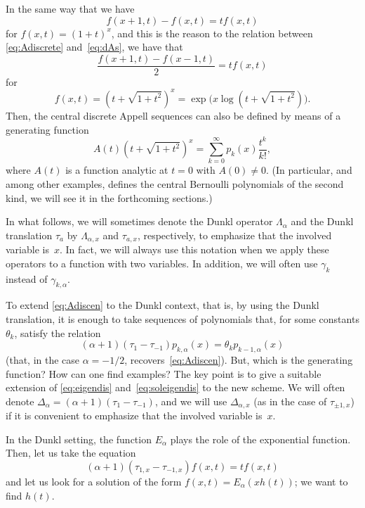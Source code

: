\documentclass[11pt]{article}
\theoremstyle{plain}
\theoremstyle{remark}
\numberwithin{equation}{section} %
\newcommand{\Ea}{E_{\alpha}}
\newcommand{\La}{\Lambda_{\alpha}}
\newcommand{\Lax}{\Lambda_{\alpha,x}}
\newcommand{\cc}{\gamma}
\begin{document}
In the same way that we have
\[
  f(x+1,t) - f(x,t) = t f(x,t)
\]
for $f(x,t) = (1+t)^x$, and this is the reason to the relation between \eqref{eq:Adiscrete} and~\eqref{eq:dAs}, we have that
\begin{equation}
\label{eq:eigendis}
  \frac{f(x+1,t) - f(x-1,t)}{2} = t f(x,t)
\end{equation}
for 
\begin{equation}
\label{eq:soleigendis}
  f(x,t) = (t+\sqrt{1+t^2})^x
  = \exp\big(x \log(t+\sqrt{1+t^2})\big).
\end{equation}
Then, the central discrete Appell sequences can also be defined by means of a generating function
\begin{equation}
\label{eq:dAsc}
  A(t)(t+\sqrt{1+t^2})^x = \sum_{k=0}^{\infty} p_k(x) \frac{t^k}{k!},
\end{equation}
where $A(t)$ is a function analytic at $t=0$ with $A(0) \ne 0$. 
(In particular, and among other examples, \cite[\S\,6]{Tem} defines the central Bernoulli polynomials of the second kind, we will see it in the forthcoming sections.)

In what follows, we will sometimes denote the Dunkl operator $\La$ and the Dunkl translation $\tau_a$ by $\Lax$ and $\tau_{a,x}$, respectively, to emphasize that the involved variable is~$x$. In fact, we will always use this notation when we apply these operators to a function with two variables. 
In addition, we will often use $\cc_k$ instead of $\cc_{k,\alpha}$.

To extend \eqref{eq:Adiscen} to the Dunkl context, that is, by using the Dunkl translation, it is enough to take sequences of polynomials that, for some constants $\theta_k$, satisfy the relation
\[
  (\alpha+1)(\tau_{1}-\tau_{-1}) p_{k,\alpha}(x) = \theta_k p_{k-1,\alpha}(x)
\]
(that, in the case $\alpha=-1/2$, recovers~\eqref{eq:Adiscen}).
But, which is the generating function? How can one find examples?
The key point is to give a suitable extension of \eqref{eq:eigendis} and~\eqref{eq:soleigendis} to the new scheme. We will often denote $\Delta_\alpha = (\alpha+1)(\tau_{1}-\tau_{-1})$, and we will use $\Delta_{\alpha,x}$ (as in the case of $\tau_{\pm1,x}$) if it is convenient to emphasize that the involved variable is~$x$.

In the Dunkl setting, the function $\Ea$ plays the role of the exponential function.
Then, let us take the equation
\begin{equation}
\label{eq:tau1-1f}
  (\alpha+1)(\tau_{1,x}-\tau_{-1,x}) f(x,t) = t f(x,t)
\end{equation}
and let us look for a solution of the form $f(x,t) = \Ea(x h(t))$; we want to find $h(t)$.
\end{document}
